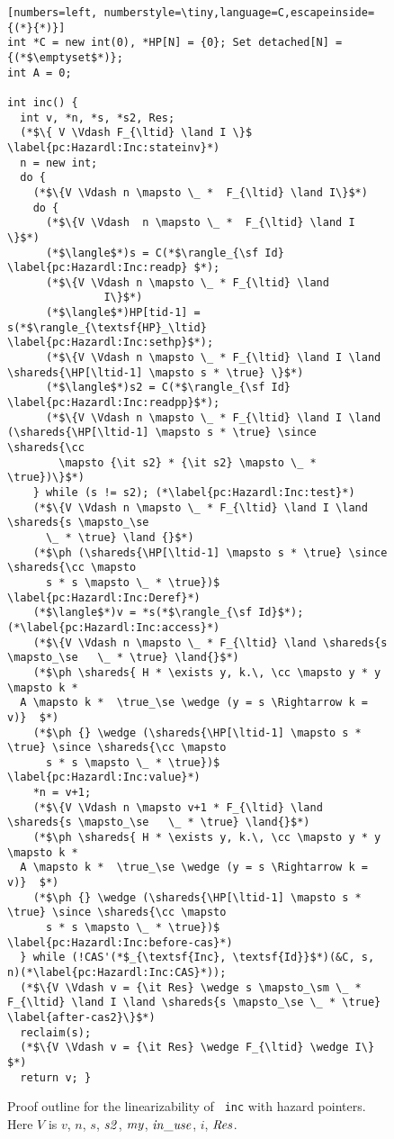 \begin{figure}[t]
{\figfontsize
\begin{lstlisting}[numbers=left, numberstyle=\tiny,language=C,escapeinside={(*}{*)}]
int *C = new int(0), *HP[N] = {0}; Set detached[N] = {(*$\emptyset$*)};
int A = 0;

int inc() {
  int v, *n, *s, *s2, Res;
  (*$\{ V \Vdash F_{\ltid} \land I \}$ \label{pc:Hazardl:Inc:stateinv}*) 
  n = new int; 
  do {
    (*$\{V \Vdash n \mapsto \_ *  F_{\ltid} \land I\}$*)
    do {
      (*$\{V \Vdash  n \mapsto \_ *  F_{\ltid} \land I \}$*)
      (*$\langle$*)s = C(*$\rangle_{\sf Id}  \label{pc:Hazardl:Inc:readp} $*);
      (*$\{V \Vdash n \mapsto \_ * F_{\ltid} \land 
               I\}$*)  
      (*$\langle$*)HP[tid-1] = s(*$\rangle_{\textsf{HP}_\ltid} \label{pc:Hazardl:Inc:sethp}$*);
      (*$\{V \Vdash n \mapsto \_ * F_{\ltid} \land I \land \shareds{\HP[\ltid-1] \mapsto s * \true} \}$*) 
      (*$\langle$*)s2 = C(*$\rangle_{\sf Id} \label{pc:Hazardl:Inc:readpp}$*);
      (*$\{V \Vdash n \mapsto \_ * F_{\ltid} \land I \land (\shareds{\HP[\ltid-1] \mapsto s * \true} \since \shareds{\cc
        \mapsto {\it s2} * {\it s2} \mapsto \_ * \true})\}$*)
    } while (s != s2); (*\label{pc:Hazardl:Inc:test}*)
    (*$\{V \Vdash n \mapsto \_ * F_{\ltid} \land I \land \shareds{s \mapsto_\se
      \_ * \true} \land {}$*)
    (*$\ph (\shareds{\HP[\ltid-1] \mapsto s * \true} \since \shareds{\cc \mapsto
      s * s \mapsto \_ * \true})$ \label{pc:Hazardl:Inc:Deref}*)
    (*$\langle$*)v = *s(*$\rangle_{\sf Id}$*); (*\label{pc:Hazardl:Inc:access}*)
    (*$\{V \Vdash n \mapsto \_ * F_{\ltid} \land \shareds{s \mapsto_\se   \_ * \true} \land{}$*)
    (*$\ph \shareds{ H * \exists y, k.\, \cc \mapsto y * y \mapsto k *
  A \mapsto k *  \true_\se \wedge (y = s \Rightarrow k = v)}  $*)
    (*$\ph {} \wedge (\shareds{\HP[\ltid-1] \mapsto s * \true} \since \shareds{\cc \mapsto
      s * s \mapsto \_ * \true})$ \label{pc:Hazardl:Inc:value}*)
    *n = v+1;
    (*$\{V \Vdash n \mapsto v+1 * F_{\ltid} \land \shareds{s \mapsto_\se   \_ * \true} \land{}$*)
    (*$\ph \shareds{ H * \exists y, k.\, \cc \mapsto y * y \mapsto k *
  A \mapsto k *  \true_\se \wedge (y = s \Rightarrow k = v)}  $*)
    (*$\ph {} \wedge (\shareds{\HP[\ltid-1] \mapsto s * \true} \since \shareds{\cc \mapsto
      s * s \mapsto \_ * \true})$ \label{pc:Hazardl:Inc:before-cas}*)
  } while (!CAS'(*$_{\textsf{Inc}, \textsf{Id}}$*)(&C, s, n)(*\label{pc:Hazardl:Inc:CAS}*));
  (*$\{V \Vdash v = {\it Res} \wedge s \mapsto_\sm \_ * F_{\ltid} \land I \land \shareds{s \mapsto_\se \_ * \true}
\label{after-cas2}\}$*)
  reclaim(s);
  (*$\{V \Vdash v = {\it Res} \wedge F_{\ltid} \wedge I\} $*)   
  return v; }
\end{lstlisting}
}
\caption{\label{fig:lin:Inc} \small Proof outline for the linearizability of {\tt
    inc} with hazard pointers.  Here $V$ is $v$, $n$, $s$, ${\it s2}$, ${\it
    my}$, ${\it in\_use}$, $i$, ${\it Res}$.}
\end{figure}



